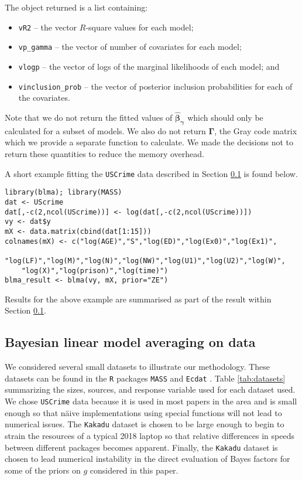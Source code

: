 \documentclass[12pt]{article}
\def\vectorfonttwo{\boldsymbol}
\def\vbeta{{\vectorfonttwo \beta}}               %
\def\vgamma{{\vectorfonttwo \gamma}}             %
\def\matrixfonttwo{\boldsymbol}
\def\mGamma{{\matrixfonttwo \Gamma}}             %
\begin{document}
\noindent 
The object returned is a 
list containing:
\begin{itemize}
	\item 
{\tt vR2} -- the vector $R$-square values for each model; 

	\item 
	{\tt vp\_gamma} -- the vector of number of covariates for each model;

	\item 
	{\tt vlogp} -- the vector of logs of the marginal likelihoods of each model; and

	\item 
	{\tt vinclusion\_prob} -- the vector of posterior inclusion probabilities for each of the covariates. 
\end{itemize}

\noindent 
Note that we do not return the fitted values of 
$\widehat{\vbeta}_{\vgamma}$ which should only be calculated
for a subset of models. We also do not return $\mGamma$, the Gray code matrix 
which we provide a separate function to calculate. We made the decisions
not to return these quantities to reduce the memory overhead.

A short example fitting the {\tt USCrime} data described in Section 
\ref{sec:BLMA} is found below.

\begin{verbatim}
library(blma); library(MASS)
dat <- UScrime
dat[,-c(2,ncol(UScrime))] <- log(dat[,-c(2,ncol(UScrime))])
vy <- dat$y
mX <- data.matrix(cbind(dat[1:15]))
colnames(mX) <- c("log(AGE)","S","log(ED)","log(Ex0)","log(Ex1)",
    "log(LF)","log(M)","log(N)","log(NW)","log(U1)","log(U2)","log(W)",
    "log(X)","log(prison)","log(time)") 
blma_result <- blma(vy, mX, prior="ZE")
\end{verbatim}

\noindent Results for the above example are summarised as part of the result within Section 
\ref{sec:BLMA}.

\subsection{Bayesian linear model averaging on data}\label{sec:BLMA}

We considered several small datasets to illustrate our methodology. These datasets
can be found in the {\tt R} packages {\tt MASS} \citep{Venables2002} and 
{\tt Ecdat} \citep{Croissant2016}. Table \ref{tab:datasets} summarizing the sizes,  
sources, and response variable used for each dataset used. 
We chose {\tt USCrime} data because it is used in most papers in
the area and is small enough so that n\"aive implementations using special functions will
not lead to numerical issues. The 
 {\tt Kakadu} dataset is chosen to
be large enough to begin to strain the resources of a typical 2018 laptop so that
relative differences in speeds between different packages becomes apparent. Finally, the
{\tt Kakadu} dataset is chosen to lead numerical instability in the direct evaluation of Bayes
factors for some of the priors on $g$ considered in this paper.
\end{document}
